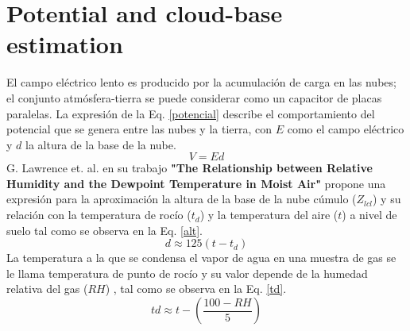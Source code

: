 \section{Potential and cloud-base estimation}
\label{app::cloudbase}

El campo eléctrico lento es producido por la acumulación de carga en las nubes; el conjunto atmósfera-tierra se puede considerar como un capacitor de placas paralelas. La expresión de la Eq. \ref{potencial} describe el comportamiento del potencial que se genera entre las nubes y la tierra, con $E$ como el campo eléctrico y $d$ la altura de la base de la nube.
\begin{equation}
    V = Ed
    \label{potencial}
\end{equation}
G. Lawrence et. al. en su trabajo \textbf{"The Relationship between Relative Humidity and the Dewpoint Temperature in Moist Air"} \cite{lawrence2005relationship} propone una expresión para la aproximación la altura de la base de la nube cúmulo ($Z_{lcl}$) y su relación con la temperatura de rocío ($t_{d}$) y la temperatura del aire ($t$) a nivel de suelo tal como se observa en la Eq. \ref{alt}.
\begin{equation}
    d\approx 125\left (t - t_{d}\right )
    \label{alt}
\end{equation}
La temperatura a la que se condensa el vapor de agua en una muestra de gas se le llama temperatura de punto de rocío y su valor depende de la humedad relativa del gas ($RH$) \cite{lawrence2005relationship}, tal como se observa en la Eq. \ref{td}.
\begin{equation}
    td \approx t - \left ( \frac{100 - RH}{5}\right)
    \label{td}
\end{equation}